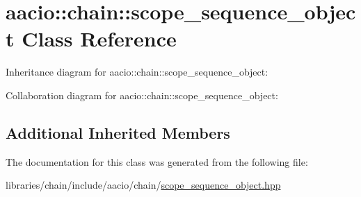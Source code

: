 \hypertarget{classaacio_1_1chain_1_1scope__sequence__object}{}\section{aacio\+:\+:chain\+:\+:scope\+\_\+sequence\+\_\+object Class Reference}
\label{classaacio_1_1chain_1_1scope__sequence__object}


Inheritance diagram for aacio\+:\+:chain\+:\+:scope\+\_\+sequence\+\_\+object\+:


Collaboration diagram for aacio\+:\+:chain\+:\+:scope\+\_\+sequence\+\_\+object\+:
\subsection*{Additional Inherited Members}


The documentation for this class was generated from the following file\+:\begin{DoxyCompactItemize}
\item 
libraries/chain/include/aacio/chain/\mbox{\hyperlink{scope__sequence__object_8hpp}{scope\+\_\+sequence\+\_\+object.\+hpp}}\end{DoxyCompactItemize}
